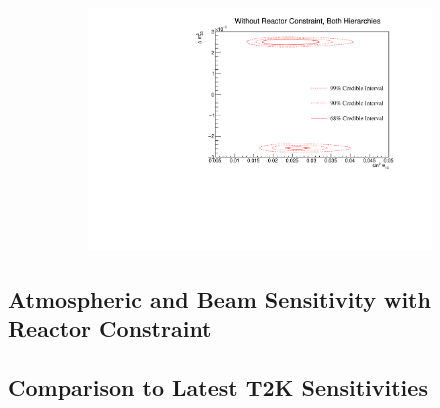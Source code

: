 \begin{figure}[h]
  \begin{subfigure}[t]{1.0\textwidth}
    \includegraphics[width=\textwidth, trim={0mm 0mm 0mm 0mm}, clip,page=1]{Figures/OA/JointFit/Contours_2D_th13_dm32_BH_0_woRC_UnSmeared_CredibleInterval.pdf}
  \end{subfigure}
  \caption{}
  \label{fig:OscillationAnalysis_JointFit_DM32TH13}
\end{figure}

\subsection{Atmospheric and Beam Sensitivity with Reactor Constraint}
\label{sec:OscillationAnalysis_JointFit_wRC}



\subsection{Comparison to Latest T2K Sensitivities}

